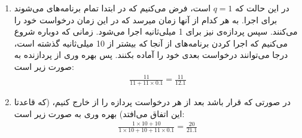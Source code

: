 \begin{enumerate}
    \item در این حالت که
    $q = 1$
    است، فرض می‌کنیم که در ابتدا تمام برنامه‌های
    می‌شوند برای اجرا. به هر کدام از آنها
    زمان میرسد که در این زمان درخواست
    خود را
    می‌کنند. سپس پردازه‌ی
    نیز برای 1 میلی‌ثانیه اجرا می‌شود. زمانی که دوباره شروع می‌کنیم که اجرا کردن برنامه‌های
    از آنجا که بیشتر از 10 میلی‌ثانیه گذشته است، درجا می‌توانند درخواست بعدی خود را آماده بکنند.
    پس بهره وری از پردازنده به صورت زیر است:
    \begin{gather*}
        \frac{11}{11 + 11 \times 0.1} = \frac{11}{12.1}
    \end{gather*}
    \item
    در صورتی که قرار باشد بعد از هر درخواست
    پردازه را از
    خارج کنیم، (که قاعدتا این اتفاق می‌افتد)
    بهره وری به صورت زیر است:
    \begin{gather*}
        \frac{1 \times 10 + 10}{1 \times 10 + 10 + 11 \times 0.1} = \frac{20}{21.1}
    \end{gather*}
\end{enumerate}
